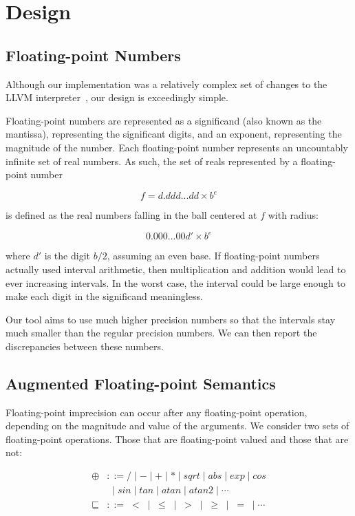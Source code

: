 \section{Design}

\subsection{Floating-point Numbers}
Although our implementation was a relatively complex set of changes to the LLVM interpreter~\cite{lli}, our design is exceedingly simple.

Floating-point numbers are represented as a significand (also known as the mantissa), representing the significant digits, and an exponent, representing the magnitude of the number. Each floating-point number represents an uncountably infinite set of real numbers. As such, the set of reals represented by a floating-point number

$$ f = d.ddd...dd \times b^e $$

is defined as the real numbers falling in the ball centered at $f$ with
radius:

$$ 0.000...00d\prime \times b^e $$

where $d\prime$ is the digit $b/2$, assuming an even base. If floating-point numbers actually used interval arithmetic, then multiplication and addition would lead to ever increasing intervals. In the worst case, the interval could be large enough to make each digit in the significand meaningless.

Our tool aims to use much higher precision numbers so that the intervals stay much smaller than the regular precision numbers. We can then report the discrepancies between these numbers.

\subsection{Augmented Floating-point Semantics}

Floating-point imprecision can occur after any floating-point operation, depending on the magnitude and value of the arguments. We consider two sets of floating-point operations. Those that are floating-point valued and those that are not:

\begin{align*}
\oplus &::= /
      \mid -
      \mid +
      \mid *
      \mid sqrt
      \mid abs
      \mid exp
      \mid cos \\
      &\;\mid sin
      \mid tan
      \mid atan
      \mid atan2
      \mid \cdots \\
\sqsubseteq &::= \;<\;
           \mid \;\leq\;
           \mid \;>\;
           \mid \;\geq\;
           \mid \;=\;
           \mid \cdots
\end{align*}

